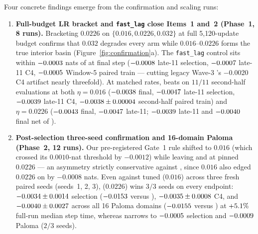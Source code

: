 Four concrete findings emerge from the \confTotalRuns{} confirmation and scaling
runs:
\begin{enumerate}
\item \textbf{Full-budget LR bracket and \texttt{fast\_lag} 
  close Items~1 and~2 (Phase~1, 8 runs).}
  Bracketing $0.0226$ on $\{0.016, 0.0226, 0.032\}$ at full 5{,}120-update
  budget confirms that $0.032$ degrades every arm while $0.016$--$0.0226$ forms
  the true interior basin (Figure~\ref{fig:confirmation}a). The
  \texttt{fast\_lag}  control sits within
  $-0.0003{}$ nats of  at final step
  ($-0.0008{}$ late-11 selection, $-0.0007{}$
  late-11 C4, $-0.0005{}$ Window-5 paired train --- cutting legacy
  Wave-3 's $-0.0020$ C4 artifact nearly threefold). At matched
  rates,  beats  on $11/11$ second-half
  evaluations at both $\eta=0.016$ ($-0.0038{}$ final,
  $-0.0047{}$ late-11 selection,
  $-0.0039{}$ late-11 C4,
  $-0.0038{} \pm 0.00004{}$
  second-half paired train) and $\eta=0.0226$ ($-0.0043{}$
  final, $-0.0047{}$ late-11;
  $-0.0039{}$ late-11 and
  $-0.0040{}$ final net of ).
\item \textbf{Post-selection three-seed confirmation and 16-domain Paloma
  (Phase~2, 12 runs).}
  Our pre-registered Gate~1 rule shifted  to $0.016$ (which crossed
  its $0.0010$-nat threshold by $-0.0012$) while leaving  and
   at pinned $0.0226$ --- an asymmetry strictly conservative
  against , since $0.016$ also edged $0.0226$ on
   by $-0.0008$ nats. Even against tuned 
  ($0.016$) across three fresh paired seeds (seeds~1, 2, 3), 
  ($0.0226$) wins $3/3$ seeds on every endpoint:
  $-0.0034{} \pm 0.0014{}$ selection
  ($-0.0153{}$ versus ),
  $-0.0035{} \pm 0.0008{}$ C4, and
  $-0.0040{} \pm 0.0027{}$ across all 16
  Paloma domains ($-0.0155{}$ versus ) at
  $+5.1\%$ full-run median step time, whereas 
  narrows to $-0.0005{}$ selection and
  $-0.0009{}$ Paloma ($2/3$ seeds).

\end{enumerate}
